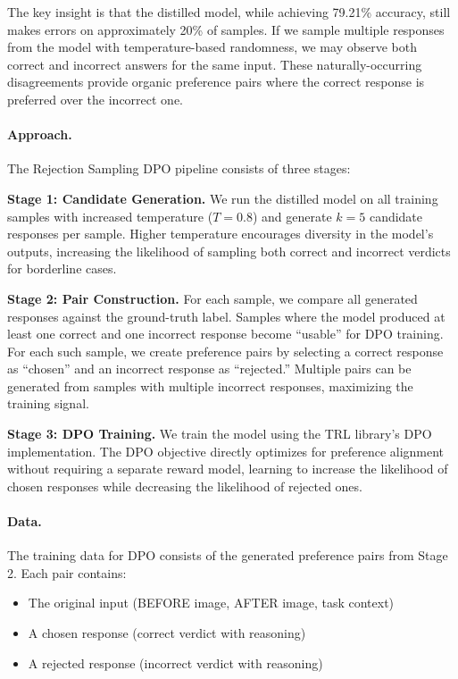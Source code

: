 \documentclass[11pt,a4paper]{article}
\begin{document}
The key insight is that the distilled model, while achieving 79.21\% accuracy, still makes errors on approximately 20\% of samples. If we sample multiple responses from the model with temperature-based randomness, we may observe both correct and incorrect answers for the same input. These naturally-occurring disagreements provide organic preference pairs where the correct response is preferred over the incorrect one.

\paragraph{Approach.} The Rejection Sampling DPO pipeline consists of three stages:

\textbf{Stage 1: Candidate Generation.} We run the distilled model on all training samples with increased temperature ($T=0.8$) and generate $k=5$ candidate responses per sample. Higher temperature encourages diversity in the model's outputs, increasing the likelihood of sampling both correct and incorrect verdicts for borderline cases.

\textbf{Stage 2: Pair Construction.} For each sample, we compare all generated responses against the ground-truth label. Samples where the model produced at least one correct and one incorrect response become ``usable'' for DPO training. For each such sample, we create preference pairs by selecting a correct response as ``chosen'' and an incorrect response as ``rejected.'' Multiple pairs can be generated from samples with multiple incorrect responses, maximizing the training signal.

\textbf{Stage 3: DPO Training.} We train the model using the TRL library's DPO implementation. The DPO objective directly optimizes for preference alignment without requiring a separate reward model, learning to increase the likelihood of chosen responses while decreasing the likelihood of rejected ones.

\paragraph{Data.} The training data for DPO consists of the generated preference pairs from Stage 2. Each pair contains:
\begin{itemize}
    \item The original input (BEFORE image, AFTER image, task context)
    \item A chosen response (correct verdict with reasoning)
    \item A rejected response (incorrect verdict with reasoning)
\end{itemize}
\end{document}
